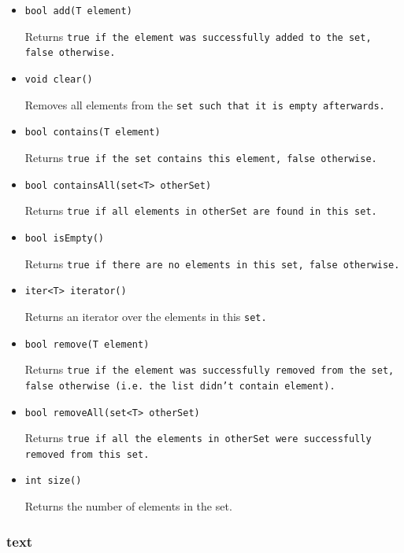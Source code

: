 \documentclass{book}
\begin{document}
\begin{itemize}

\item[] \tt bool add(T element) \rm

Returns \tt true \rm if the element was successfully added to the \tt set\rm, \tt false \rm otherwise.

\item[] \tt void clear() \rm

Removes all elements from the \tt set \rm such that it is empty afterwards.

\item[] \tt bool contains(T element) \rm

Returns \tt true \rm if the \tt set \rm contains this element, \tt false \rm otherwise.

\item[] \tt bool containsAll(set<T> otherSet) \rm

Returns \tt true \rm if all elements in \tt otherSet \rm are found in this set.

\item[] \tt bool isEmpty() \rm

Returns \tt true \rm if there are no elements in this \tt set\rm, \tt false \rm otherwise.

\item[] \tt iter<T> iterator() \rm

Returns an iterator over the elements in this \tt set\rm.

\item[] \tt bool remove(T element) \rm

Returns \tt true \rm if the element was successfully removed from the \tt set\rm, \tt false \rm otherwise (i.e. the \tt list
\rm didn't contain \tt element\rm).

\item[] \tt bool removeAll(set<T> otherSet) \rm

Returns \tt true \rm if all the elements in \tt otherSet \rm were successfully removed from this set.

\item[] \tt int size() \rm

Returns the number of elements in the set.

\end{itemize}


\subsubsection{text} %
\label{ssub:text}
\end{document}
